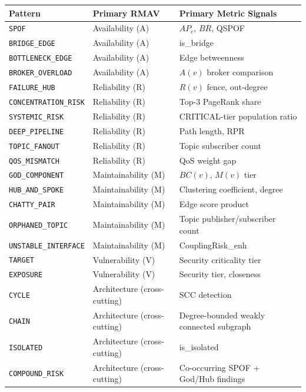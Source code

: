 \documentclass[11pt]{article}
\begin{document}
\begin{center}
\begin{longtable}{@{}lll@{}}
\toprule
\textbf{Pattern} & \textbf{Primary RMAV} & \textbf{Primary Metric Signals} \\
\midrule
\endhead
\texttt{SPOF} & Availability (A) & $AP_c$, $BR$, QSPOF \\
\texttt{BRIDGE\_EDGE} & Availability (A) & is\_bridge \\
\texttt{BOTTLENECK\_EDGE} & Availability (A) & Edge betweenness \\
\texttt{BROKER\_OVERLOAD} & Availability (A) & $A(v)$ broker comparison \\
\texttt{FAILURE\_HUB} & Reliability (R) & $R(v)$ fence, out-degree \\
\texttt{CONCENTRATION\_RISK} & Reliability (R) & Top-3 PageRank share \\
\texttt{SYSTEMIC\_RISK} & Reliability (R) & CRITICAL-tier population ratio \\
\texttt{DEEP\_PIPELINE} & Reliability (R) & Path length, RPR \\
\texttt{TOPIC\_FANOUT} & Reliability (R) & Topic subscriber count \\
\texttt{QOS\_MISMATCH} & Reliability (R) & QoS weight gap \\
\texttt{GOD\_COMPONENT} & Maintainability (M) & $BC(v)$, $M(v)$ tier \\
\texttt{HUB\_AND\_SPOKE} & Maintainability (M) & Clustering coefficient, degree \\
\texttt{CHATTY\_PAIR} & Maintainability (M) & Edge score product \\
\texttt{ORPHANED\_TOPIC} & Maintainability (M) & Topic publisher/subscriber count \\
\texttt{UNSTABLE\_INTERFACE} & Maintainability (M) & CouplingRisk\_enh \\
\texttt{TARGET} & Vulnerability (V) & Security criticality tier \\
\texttt{EXPOSURE} & Vulnerability (V) & Security tier, closeness \\
\texttt{CYCLE} & Architecture (cross-cutting) & SCC detection \\
\texttt{CHAIN} & Architecture (cross-cutting) & Degree-bounded weakly connected subgraph \\
\texttt{ISOLATED} & Architecture (cross-cutting) & is\_isolated \\
\texttt{COMPOUND\_RISK} & Architecture (cross-cutting) & Co-occurring SPOF + God/Hub findings \\
\bottomrule
\end{longtable}
\end{center}
\end{document}
